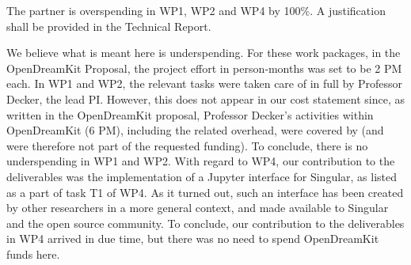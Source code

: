 \begin{EUcomment}
  The partner is overspending in WP1, WP2 and WP4 by 100\%. A
  justification shall be provided in the Technical Report.
\end{EUcomment}
We believe what is meant here is underspending. For these work packages, in the OpenDreamKit Proposal, 
the  project effort in person‑months was set to be 2 PM each. In WP1 and WP2, the relevant tasks were taken care 
of in full by Professor Decker, the lead PI. However, this does not appear in our cost statement since, as written
in the OpenDreamKit proposal,  Professor Decker’s activities within OpenDreamKit (6 PM), including the related 
overhead, were covered by  (and were therefore not part of the requested funding). To conclude, there is 
no  underspending in WP1 and WP2. With regard to WP4, our contribution to the deliverables was the 
implementation of a Jupyter interface for Singular, as listed as a part of task T1 of WP4. As it turned out, 
such an interface has been created by other researchers in a more general context, and made available to 
Singular and the open source community. To conclude, our contribution to the deliverables in WP4 arrived
in due time, but there was no need to spend OpenDreamKit funds here.

